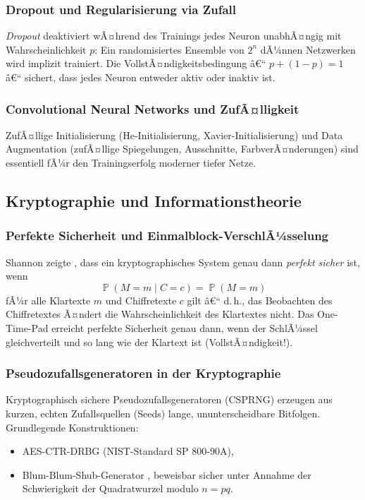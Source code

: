 ﻿\documentclass[12pt,a4paper]{article}
\theoremstyle{definition}
\theoremstyle{plain}
\theoremstyle{remark}
\DeclareMathOperator{\Prob}{\mathbb{P}}
\begin{document}
\subsubsection{Dropout und Regularisierung via Zufall}
\emph{Dropout} \cite{srivastava2014dropout} deaktiviert wÃ¤hrend des Trainings
jedes Neuron unabhÃ¤ngig mit Wahrscheinlichkeit $p$: Ein randomisiertes
Ensemble von $2^n$ dÃ¼nnen Netzwerken wird implizit trainiert. Die
VollstÃ¤ndigkeitsbedingung â€“ $p + (1-p) = 1$ â€“ sichert, dass jedes Neuron
entweder aktiv oder inaktiv ist.

\subsubsection{Convolutional Neural Networks und ZufÃ¤lligkeit}
ZufÃ¤llige Initialisierung (He-Initialisierung, Xavier-Initialisierung)
und Data Augmentation (zufÃ¤llige Spiegelungen, Ausschnitte, FarbverÃ¤nderungen)
sind essentiell fÃ¼r den Trainingserfolg moderner tiefer Netze.

\subsection{Kryptographie und Informationstheorie}

\subsubsection{Perfekte Sicherheit und Einmalblock-VerschlÃ¼sselung}
Shannon zeigte \cite{shannon1949communication}, dass ein kryptographisches
System genau dann \emph{perfekt sicher} ist, wenn
\[
  \Prob(M = m \mid C = c) = \Prob(M = m)
\]
fÃ¼r alle Klartexte $m$ und Chiffretexte $c$ gilt â€“ d.\,h., das Beobachten des
Chiffretextes Ã¤ndert die Wahrscheinlichkeit des Klartextes nicht. Das
One-Time-Pad erreicht perfekte Sicherheit genau dann, wenn der SchlÃ¼ssel
gleichverteilt und so lang wie der Klartext ist (VollstÃ¤ndigkeit!).

\subsubsection{Pseudozufallsgeneratoren in der Kryptographie}
Kryptographisch sichere Pseudozufallsgeneratoren (CSPRNG) erzeugen aus
kurzen, echten Zufallsquellen (Seeds) lange, ununterscheidbare Bitfolgen.
Grundlegende Konstruktionen:
\begin{itemize}
  \item AES-CTR-DRBG (NIST-Standard SP 800-90A),
  \item Blum-Blum-Shub-Generator \cite{blum1986simple}, beweisbar sicher
    unter Annahme der Schwierigkeit der Quadratwurzel modulo $n=pq$.
\end{itemize}
\end{document}
